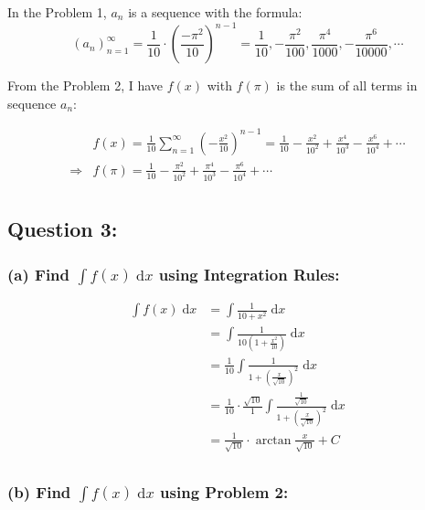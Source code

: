 \documentclass[12pt]{article}
\begin{document}
\noindent In the Problem 1, $a_n$ is a sequence with the formula: $$\displaystyle (a_n)_{n=1}^{\infty} = \frac{1}{10}\cdot \left(\frac{-\pi^2}{10} \right)^{n-1}= 
\frac{1}{10},-\frac{\pi^2}{100},\frac{\pi^4}{1000},-\frac{\pi^6}{10000}, \cdots $$


\noindent From the Problem 2, I have $f(x)$ with $f(\pi)$ is the sum of all terms in sequence $a_n$:

\begin{align*}
    & f(x)=\frac{1}{10} \sum_{n=1}^\infty \left(- \frac{x^2}{10} \right)^{n-1}= \frac{1}{10}
    - \frac{x^2}{10^2}
    + \frac{x^4}{10^3}
    - \frac{x^6}{10^4}
    + \cdots\\
    \Longrightarrow
    & f(\pi)= \frac{1}{10}
    - \frac{\pi^2}{10^2}
    + \frac{\pi^4}{10^3}
    - \frac{\pi^6}{10^4}
    + \cdots\\
\end{align*}



    
    
\vspace{1cm}

\subsection*{Question 3:}
\subsubsection*{(a) Find ${\displaystyle \int f(x) \;\mathrm{d}x}$ using Integration Rules:}

\begin{align*}
    \int f(x) \;\mathrm{d}x &= \int \frac{1}{10+x^2} \;\mathrm{d}x\\
    &= \int \frac{1}{10\left(1+ \frac{x^2}{10} \right)} \;\mathrm{d}x\\
    &= \frac{1}{10} \int \frac{1}{1+ \left(\frac{x}{\sqrt{10}} \right)^2} \;\mathrm{d}x\\
    &= \frac{1}{10}\cdot \frac{\sqrt{10}}{1} \int \frac{\frac{1}{\sqrt{10}}}{1+ \left(\frac{x}{\sqrt{10}} \right)^2} \;\mathrm{d}x\\
    &= \frac{1}{\sqrt{10}}\cdot \arctan{\frac{x}{\sqrt{10}}} +C \\
\end{align*}




\subsubsection*{(b) Find ${\displaystyle \int f(x) \;\mathrm{d}x}$ using Problem 2:}
\end{document}
